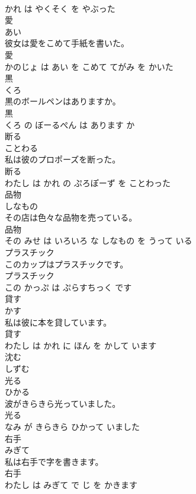 \documentclass[8pt]{extreport}
\begin{document}
\begin{CJK}{UTF8}{min}
\\	かれ は やくそく を やぶった			
\\	愛	
\\	あい			
\\	彼女は愛をこめて手紙を書いた。	
\\	愛 
\\	かのじょ は あい を こめて てがみ を かいた			
\\	黒	
\\	くろ			
\\	黒のボールペンはありますか。	
\\	黒 
\\	くろ の ぼーるぺん は あります か			
\\	断る	
\\	ことわる			
\\	私は彼のプロポーズを断った。	
\\	断る 
\\	わたし は かれ の ぷろぽーず を ことわった			
\\	品物	
\\	しなもの			
\\	その店は色々な品物を売っている。	
\\	品物 
\\	その みせ は いろいろ な しなもの を うって いる			
\\	プラスチック	
\\	このカップはプラスチックです。	
\\	プラスチック 
\\	この かっぷ は ぷらすちっく です			
\\	貸す	
\\	かす			
\\	私は彼に本を貸しています。	
\\	貸す 
\\	わたし は かれ に ほん を かして います			
\\	沈む	
\\	しずむ			
\\	光る	
\\	ひかる			
\\	波がきらきら光っていました。	
\\	光る 
\\	なみ が きらきら ひかって いました			
\\	右手	
\\	みぎて			
\\	私は右手で字を書きます。	
\\	右手 
\\	わたし は みぎて で じ を かきます			

\end{CJK}
\end{document}
